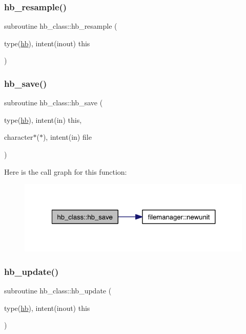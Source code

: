 \mbox{\label{namespacehb__class_a9d6faaa888c003d629e1b35f8b510832}} 
\subsubsection{\texorpdfstring{hb\+\_\+resample()}{hb\_resample()}}
{\footnotesize\ttfamily subroutine hb\+\_\+class\+::hb\+\_\+resample (\begin{DoxyParamCaption}\item[{type(\hyperlink{structhb__class_1_1hb}{hb}), intent(inout)}]{this }\end{DoxyParamCaption})\hspace{0.3cm}{\ttfamily [private]}}

\mbox{\label{namespacehb__class_a53b39344e155580d8d2161a497774364}} 
\subsubsection{\texorpdfstring{hb\+\_\+save()}{hb\_save()}}
{\footnotesize\ttfamily subroutine hb\+\_\+class\+::hb\+\_\+save (\begin{DoxyParamCaption}\item[{type(\hyperlink{structhb__class_1_1hb}{hb}), intent(in)}]{this,  }\item[{character$\ast$($\ast$), intent(in)}]{file }\end{DoxyParamCaption})\hspace{0.3cm}{\ttfamily [private]}}

Here is the call graph for this function\+:\nopagebreak
\begin{figure}[H]
\begin{center}
\leavevmode
\includegraphics[width=324pt]{namespacehb__class_a53b39344e155580d8d2161a497774364_cgraph}
\end{center}
\end{figure}
\mbox{\label{namespacehb__class_a03d6e94665987e6ce2a283953632fb3f}} 
\subsubsection{\texorpdfstring{hb\+\_\+update()}{hb\_update()}}
{\footnotesize\ttfamily subroutine hb\+\_\+class\+::hb\+\_\+update (\begin{DoxyParamCaption}\item[{type(\hyperlink{structhb__class_1_1hb}{hb}), intent(inout)}]{this }\end{DoxyParamCaption})\hspace{0.3cm}{\ttfamily [private]}}


